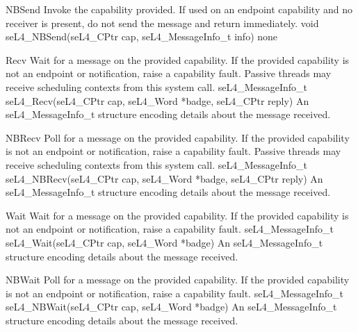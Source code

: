 {NBSend}
{Invoke the capability provided. If used on an endpoint capability and no receiver is present, do
    not send the message and return immediately.}
{void seL4\_NBSend(seL4\_CPtr cap, seL4\_MessageInfo\_t info)}
{
}
{none}

{Recv}
{Wait for a message on the provided capability. If the provided capability is not an endpoint or
    notification, raise a capability fault. Passive threads may receive scheduling contexts from 
this system call.}
    {seL4\_MessageInfo\_t seL4\_Recv(seL4\_CPtr cap, seL4\_Word *badge, seL4\_CPtr reply)}
{
}
{An seL4\_MessageInfo\_t structure encoding details about the message received.}


{NBRecv}
{Poll for a message on the provided capability. If the provided capability is not an endpoint or
    notification, raise a capability fault. Passive threads may receive scheduling contexts from 
this system call.}
    {seL4\_MessageInfo\_t seL4\_NBRecv(seL4\_CPtr cap, seL4\_Word *badge, seL4\_CPtr reply)}
{
}
{An seL4\_MessageInfo\_t structure encoding details about the message received.}

{Wait}
{Wait for a message on the provided capability. If the provided capability is not an endpoint or
    notification, raise a capability fault.}
    {seL4\_MessageInfo\_t seL4\_Wait(seL4\_CPtr cap, seL4\_Word *badge)}
{
}
{An seL4\_MessageInfo\_t structure encoding details about the message received.}

{NBWait}
{Poll for a message on the provided capability. If the provided capability is not an endpoint or
    notification, raise a capability fault.}
    {seL4\_MessageInfo\_t seL4\_NBWait(seL4\_CPtr cap, seL4\_Word *badge)}
{
}
{An seL4\_MessageInfo\_t structure encoding details about the message received.}

